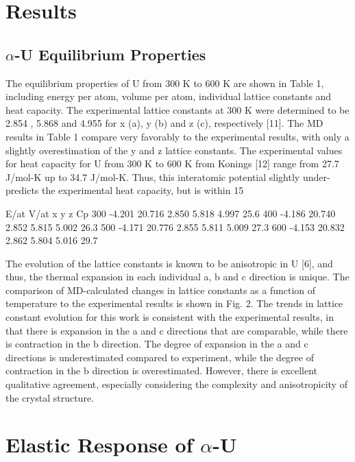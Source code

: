 \documentclass[review]{elsarticle}
\begin{document}
\FloatBarrier
\section{Results}
\subsection{$\alpha$-U Equilibrium Properties}

The equilibrium properties of U from 300 K to 600 K are shown in Table 1, including energy per atom, volume per atom, individual lattice constants and heat capacity. The experimental lattice constants at 300 K were determined to be 2.854 , 5.868 and 4.955 for x (a), y (b) and z (c), respectively [11]. The MD results in Table 1 compare very favorably to the experimental results, with only a slightly overestimation of the y and z lattice constants. The experimental values for heat capacity for U from 300 K to 600 K from Konings [12] range from 27.7 J/mol-K up to 34.7 J/mol-K. Thus, this interatomic potential slightly under-predicts the experimental heat capacity, but is within 15%

E/at V/at x y z Cp
300 -4.201 20.716 2.850 5.818 4.997 25.6
400 -4.186 20.740 2.852 5.815 5.002 26.3
500 -4.171 20.776 2.855 5.811 5.009 27.3
600 -4.153 20.832 2.862 5.804 5.016 29.7

The evolution of the lattice constants is known to be anisotropic in U [6], and thus, the thermal
expansion in each individual a, b and c direction is unique. The comparison of MD-calculated changes in
lattice constants as a function of temperature to the experimental results is shown in Fig. 2. The trends in
lattice constant evolution for this work is consistent with the experimental results, in that there is expansion
in the a and c directions that are comparable, while there is contraction in the b direction. The degree of
expansion in the a and c directions is underestimated compared to experiment, while the degree of contraction
in the b direction is overestimated. However, there is excellent qualitative agreement, especially considering
the complexity and anisotropicity of the crystal structure.

\FloatBarrier

\section{Elastic Response of $\alpha$-U}
\end{document}
